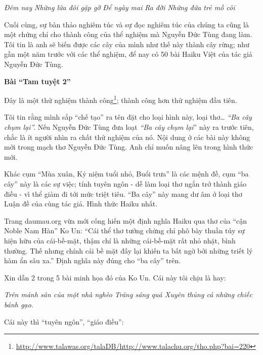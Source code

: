 \documentclass[../main.tex]{subfiles}
\begin{document}
\begin{multicols}{2}
\begin{blockquote}
\textit{Đêm nay}        
\textit{Những lứa đôi gặp gỡ }        
\textit{Để ngày mai}        
\textit{Ra đời } 
\textit{Những đứa trẻ mồ côi} 
 
 \end{blockquote}
 Cuối cùng, sự bàn thảo nghiêm túc và sự đọc nghiêm túc của chúng ta cũng là một chứng chỉ cho thành công của thể nghiệm mà Nguyễn Đức Tùng đang làm. Tôi tin là anh sẽ biến được các cây của mình như thế này thành cây rừng; như gần một năm trước với các thể nghiệm, để nay có 50 bài Haiku Việt của tác giả Nguyễn Đức Tùng. 
 
 
\textbf{Bài “Tam tuyệt 2”} 
 
Đây là một thử nghiệm thành công\footnote{\url{http://www.talawas.org/talaDB/http://www.talachu.org/tho.php?bai=220}}; thành công hơn thử nghiệm đầu tiên.  
 
Tôi tin rằng mình sắp “chế tạo” ra tên đặt cho loại hình này, loại thơ… \textit{“Ba cây chụm lại”. }Nếu Nguyễn Đức Tùng đưa loạt \textit{“Ba cây chụm lại}” này ra trước tiên\textit{, }chắc là ít người nhìn ra chất thử nghiệm của nó. Nội dung ở các bài này không mới trong mạch thơ Nguyễn Đức Tùng. Anh chỉ muốn nâng lên trong hình thức mới.  
 
Khác cụm “Mùa xuân, Kỷ niệm tuổi nhỏ, Buổi trưa” là các mệnh đề, cụm “ba cây” này là các sự việc; tính tuyên ngôn - dễ làm loại thơ ngắn trở thành giáo điều - vì thể giảm đi tới mức triệt tiêu. “Ba cây” này mang dư âm ở loại thơ Luận đề của cùng tác giả. Hình thức Haiku nhất. 
 
Trang daumau.org vừa mới cống hiến một định nghĩa Haiku qua thơ của “cận Noble Nam Hàn” Ko Un: “Cái thể thơ tưởng chừng chỉ phô bày thuần túy sự hiện hữu của cái-bề-mặt, thậm chí là những cái-bề-mặt rất nhỏ nhặt, bình thường. Thế nhưng chính cái bề mặt đấy lại khiến ta bất ngờ bởi những triết lý hàm ẩn sâu xa.”  Định nghĩa này đúng cho “ba cây” trên. 
 
Xin dẫn 2 trong 5 bài minh họa đó của Ko Un. Cái này tôi chịu là hay: 
\begin{blockquote}
 
\textit{Trên mảnh sân của một nhà nghèo   
Trăng sáng quá   
Xuyên thủng cả những chiếc bánh gạo}.   

\end{blockquote}
  
Cái này thì “tuyên ngôn”, “giáo điều”: 
\end{multicols}
\end{document}
